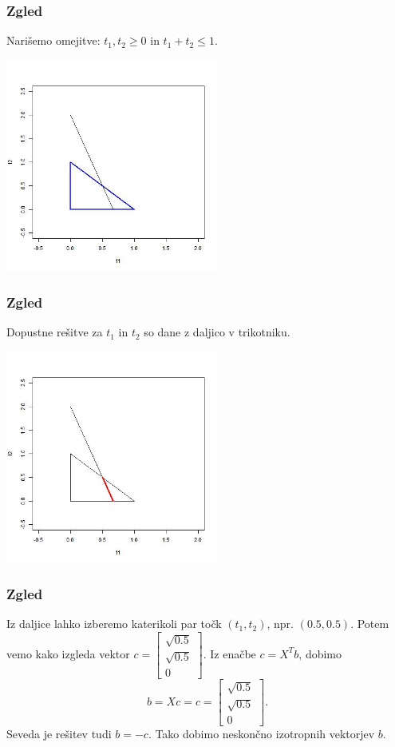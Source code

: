\documentclass{beamer}
\begin{document}
\begin{frame}
\frametitle{Zgled}
Narišemo omejitve: $t_1, t_2 \ge 0$ in $t_1+t_2\le 1$.\pause
\begin{center}
\includegraphics[width=7cm]{graf2.jpg}
\end{center}
\end{frame}
\begin{frame}
\frametitle{Zgled}
Dopustne rešitve za $t_1$ in $t_2$ so dane z daljico v trikotniku.\pause
\begin{center}
\includegraphics[width=7cm]{graf3.jpg}
\end{center}
\end{frame}
\begin{frame}
\frametitle{Zgled}
Iz daljice lahko izberemo katerikoli par točk $(t_1, t_2)$, npr. $(0.5, 0.5)$. Potem vemo kako izgleda vektor 
$c=\begin{bmatrix}
\sqrt{0.5}\\
\sqrt{0.5}\\
0
\end{bmatrix}$. Iz enačbe $c=X^T b$, dobimo 
$$b=Xc=c =\begin{bmatrix}
\sqrt{0.5}\\
\sqrt{0.5}\\
0
\end{bmatrix}.$$
Seveda je rešitev tudi $b=-c$. Tako dobimo neskončno izotropnih vektorjev $b$.
\end{frame}
\end{document}

